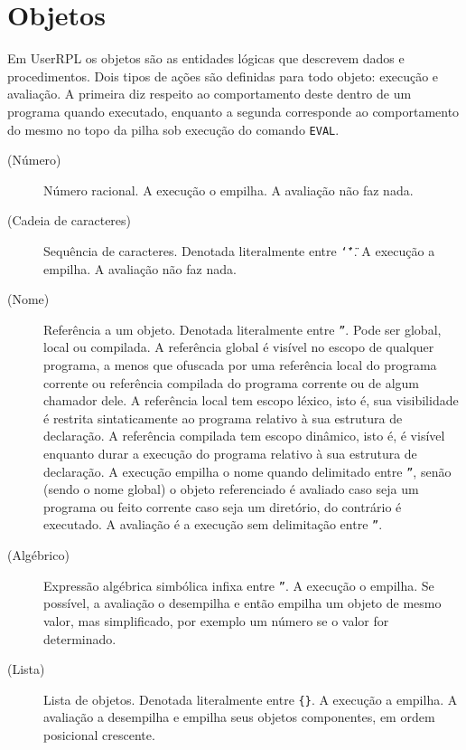 \documentclass[12pt,a4paper]{report}
\newcommand{\kwd}[1]{\texttt{\textcolor{keyword}{#1}}}
\newcommand{\EVAL}{\kwd{EVAL}}   %
\numberwithin{theorem}{chapter}
\begin{document}

\section{Objetos}

Em UserRPL os objetos são as entidades lógicas que descrevem dados e
procedimentos.  Dois tipos de ações são definidas para todo objeto:
execução e avaliação.  A primeira diz respeito ao comportamento deste
dentro de um programa quando executado, enquanto a segunda corresponde
ao comportamento do mesmo no topo da pilha sob execução do comando
\EVAL.

\begin{description}
\item[(Número)] Número racional.  A execução o empilha.  A avaliação
  não faz nada.

\item[(Cadeia de caracteres)] Sequência de caracteres.  Denotada
  literalmente entre \texttt{\char`\"\char`\"}.  A execução a empilha.
  A avaliação não faz nada.

\item[(Nome)] Referência a um objeto.  Denotada literalmente entre
  \texttt{''}.  Pode ser global, local ou compilada.  A referência
  global é visível no escopo de qualquer programa, a menos que
  ofuscada por uma referência local do programa corrente ou referência
  compilada do programa corrente ou de algum chamador dele.  A
  referência local tem escopo léxico, isto é, sua visibilidade é
  restrita sintaticamente ao programa relativo à sua estrutura de
  declaração.  A referência compilada tem escopo dinâmico, isto é, é
  visível enquanto durar a execução do programa relativo à sua
  estrutura de declaração.  A execução empilha o nome quando
  delimitado entre \texttt{''}, senão (sendo o nome global) o objeto
  referenciado é avaliado caso seja um programa ou feito corrente caso
  seja um diretório, do contrário é executado.  A avaliação é a
  execução sem delimitação entre \texttt{''}.

\item[(Algébrico)] Expressão algébrica simbólica infixa entre
  \texttt{''}.  A execução o empilha.  Se possível, a avaliação o
  desempilha e então empilha um objeto de mesmo valor, mas
  simplificado, por exemplo um número se o valor for determinado.

\item[(Lista)] Lista de objetos.  Denotada literalmente entre
  \texttt{\{\}}.  A execução a empilha.  A avaliação a desempilha e
  empilha seus objetos componentes, em ordem posicional crescente.


\end{description}
\end{document}
